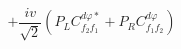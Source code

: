%
\begin{dmath*}
%
  +  \frac{i v}{\sqrt{2}} \left(P_L C^{d \varphi  *}_{f_2 f_1} + P_R C^{d \varphi  }_{f_1 f_2}\right)
%
\end{dmath*}
%
